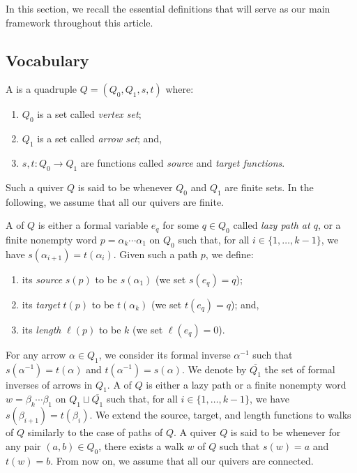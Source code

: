 \pagestyle{plain}

In this section, we recall the essential definitions that will serve as our main framework throughout this article. 

\subsection{Vocabulary}
\label{ss:Vocab}

A  is a quadruple $Q = (Q_0,Q_1,s,t)$ where:
\begin{enumerate}[label=$\bullet$, itemsep=1mm]
    \item $Q_0$ is a set called \emph{vertex set};
    \item $Q_1$ is a set called \emph{arrow set}; and,
    \item $s,t : Q_0 \longrightarrow Q_1$ are functions called \emph{source} and \emph{target functions}.
\end{enumerate}
Such a quiver $Q$ is said to be  whenever $Q_0$ and $Q_1$ are finite sets. In the following, we assume that all our quivers are finite.

A  of $Q$ is either a formal variable $e_q$ for some $q \in Q_0$ called \emph{lazy path at $q$}, or a finite nonempty word $p = \alpha_k \cdots \alpha_1$ on $Q_0$ such that, for all $i \in \{1,\ldots,k-1\}$, we have $s(\alpha_{i+1}) = t(\alpha_i)$. Given such a path $p$, we define:
\begin{enumerate}[label=$\bullet$, itemsep=1mm]
    \item its \emph{source} $s(p)$ to be $s(\alpha_1)$ (we set $s(e_q) = q$);
    \item its \emph{target} $t(p)$ to be $t(\alpha_k)$ (we set $t(e_q) = q$); and,
    \item its \textit{length} $\ell(p)$ to be $k$ (we set $\ell(e_q) = 0$).
\end{enumerate}
For any arrow $\alpha \in Q_1$, we consider its formal inverse $\alpha^{-1}$ such that $s(\alpha^{-1}) = t(\alpha)$ and $t(\alpha^{-1}) = s(\alpha)$. We denote by $\overline{Q_1}$ the set of formal inverses of arrows in $Q_1$. A  of $Q$ is either a lazy path or a finite nonempty word $w = \beta_k \cdots \beta_1$ on $Q_1 \sqcup \overline{Q_1}$ such that, for all $i \in \{1,\ldots,k-1\}$, we have $s(\beta_{i+1}) = t(\beta_i)$. We extend the source, target, and length functions to walks of $Q$ similarly to the case of paths of $Q$. A quiver $Q$ is said to be  whenever for any pair $(a,b) \in Q_0$, there exists a walk $w$ of $Q$ such that $s(w) = a$ and $t(w)=b$. From now on, we assume that all our quivers are connected.

